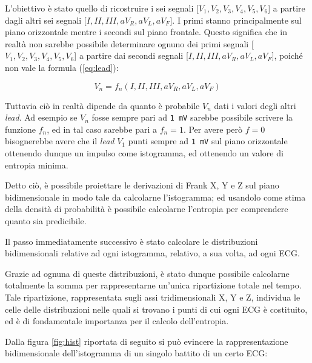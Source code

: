 \documentclass[12pt,italian]{report}
\begin{document}
	L'obiettivo è stato quello di ricostruire i sei segnali [$ V_{1}, V_{2}, V_{3}, V_{4}, V_{5}, V_{6} $] a partire dagli altri sei segnali [$ I, II, III, aV_{R}, aV_{L}, aV_{F} $]. I primi stanno principalmente sul piano orizzontale mentre i secondi sul piano frontale. Questo significa che in realtà non sarebbe possibile determinare ognuno dei primi segnali [$ V_{1}, V_{2}, V_{3}, V_{4}, V_{5}, V_{6} $] a partire dai secondi segnali [$ I, II, III, aV_{R}, aV_{L}, aV_{F} $], poiché non vale la formula (\ref{eq:lead}):
	
	\begin{equation}
		V_{n} = f_{n}(I, II, III, aV_{R}, aV_{L}, aV_{F})
		\label{eq:lead}
	\end{equation}
	
	Tuttavia ciò in realtà dipende da quanto è probabile $ V_{n} $ dati i valori degli altri \textit{lead}. Ad esempio se $ V_{n} $ fosse sempre pari ad \texttt{1 mV} sarebbe possibile scrivere la funzione $ f_{n} $, ed in tal caso sarebbe pari a $ f_{n} = 1 $. Per avere però $ f = 0 $ bisognerebbe avere che il \textit{lead} $ V_{1} $ punti sempre ad \texttt{1 mV} sul piano orizzontale ottenendo dunque un impulso come istogramma, ed ottenendo un valore di entropia minima.
	
	Detto ciò, è possibile proiettare le derivazioni di Frank X, Y e Z sul piano bidimensionale in modo tale da calcolarne l'istogramma; ed usandolo come stima della densità di probabilità è possibile calcolarne l'entropia per comprendere quanto sia predicibile.
	
	Il passo immediatamente successivo è stato calcolare le distribuzioni bidimensionali relative ad ogni istogramma, relativo, a sua volta, ad ogni ECG.
	
	Grazie ad ognuna di queste distribuzioni, è stato dunque possibile calcolarne totalmente la somma per rappresentarne un'unica ripartizione totale nel tempo. Tale ripartizione, rappresentata sugli assi tridimensionali X, Y e Z, individua le celle delle distribuzioni nelle quali si trovano i punti di cui ogni ECG è costituito, ed è di fondamentale importanza per il calcolo dell'entropia.
	
	Dalla figura \ref{fig:hist} riportata di seguito si può evincere la rappresentazione bidimensionale dell'istogramma di un singolo battito di un certo ECG:
	
\end{document}
